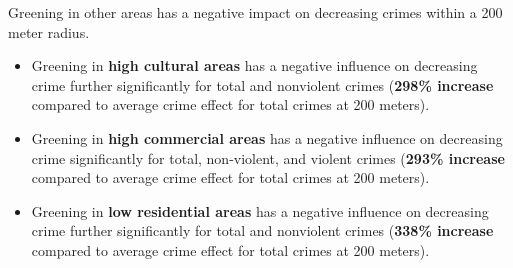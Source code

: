\documentclass{article}
\begin{document}
Greening in other areas has a negative impact on decreasing crimes within a 200 meter radius. 
\begin{itemize}
    \item Greening in \textbf{high cultural areas} has a negative influence on decreasing crime further significantly for total and nonviolent crimes (\textbf{298\% increase} compared to average crime effect for total crimes at 200 meters).
    \item Greening in \textbf{high commercial areas} has a negative influence on decreasing crime significantly for total, non-violent, and violent crimes (\textbf{293\% increase} compared to average crime effect for total crimes at 200 meters). 
    \item Greening in \textbf{low residential areas} has a negative influence on decreasing crime further significantly for total and nonviolent crimes (\textbf{338\% increase} compared to average crime effect for total crimes at 200 meters).
\end{itemize}
\end{document}

